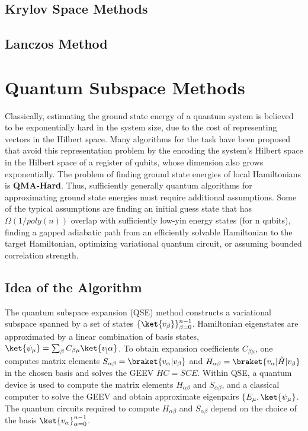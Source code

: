 \documentclass[12pt, oneside]{book}
\theoremstyle{definition}
\theoremstyle{definition}
\theoremstyle{remark}
\begin{document}
\subsection{Krylov Space Methods}
\subsection{Lanczos Method}

\section{Quantum Subspace Methods}
Classically, estimating the ground state energy of a quantum system is believed to be exponentially hard in the system size, due to the cost of representing vectors in the Hilbert space. Many algorithms for the task have been proposed that avoid this representation problem by the encoding the system's Hilbert space in the Hilbert space of a register of qubits, whose dimension also grows exponentially. The problem of finding ground state energies of local Hamiltonians is \textbf{QMA-Hard}. Thus, sufficiently generally quantum algorithms for approximating ground state energies must require additional assumptions.
Some of the typical assumptions are finding an initial guess state that has $\Omega(1/poly(n))$ overlap with sufficiently low-yin energy states (for n qubits), finding a gapped adiabatic path from an efficiently solvable Hamiltonian to the target Hamiltonian, optimizing variational quantum circuit, or assuming bounded correlation strength.

\subsection{Idea of the Algorithm}
The quantum subspace expansion (QSE) method constructs a variational subspace spanned by a set of states $\{\ket{v_\beta}\}_{\beta=0}^{n-1}$. Hamiltonian eigenstates are approximated by a linear combination of basis states, $\ket{\psi_{\mu}}=\sum_{\beta} C_{\beta\mu}\ket{v_[\alpha}$. To obtain expansion coefficients $C_{\beta\mu}$, one computes matrix elements $S_{\alpha\beta}=\braket{v_{\alpha}|v_\beta}$ and $H_{\alpha\beta}=\braket{v_{\alpha}|\hat{H}|v_{\beta}}$ in the chosen basis and solves the GEEV $HC=SCE$. Within QSE, a quantum device is used to compute the matrix elements $H_{\alpha\beta}$ and $S_{\alpha\beta}$, and a classical computer to solve the GEEV and obtain approximate eigenpairs $\{E_{\mu},\ket{\psi_{\mu}}$. The quantum circuits required to compute $H_{\alpha\beta}$ and $S_{\alpha\beta}$ depend on the choice of the basis $\ket{v_{\alpha}}_{\alpha=0}^{n-1}$.
\end{document}
